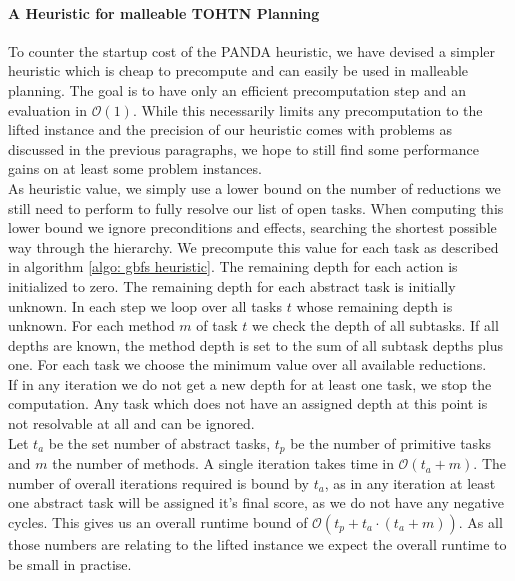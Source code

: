 \paragraph{A Heuristic for malleable TOHTN Planning}
To counter the startup cost of the PANDA heuristic, we have devised a simpler heuristic which is cheap to precompute and can easily be used in malleable planning. The goal is to have only an efficient precomputation step and an evaluation in $\mathcal{O}(1)$. While this necessarily limits any precomputation to the lifted instance and the precision of our heuristic comes with problems as discussed in the previous paragraphs, we hope to still find some performance gains on at least some problem instances. \\
As heuristic value, we simply use a lower bound on the number of reductions we still need to perform to fully resolve our list of open tasks. When computing this lower bound we ignore preconditions and effects, searching the shortest possible way through the hierarchy. We precompute this value for each task as described in algorithm \ref{algo: gbfs heuristic}. The remaining depth for each action is initialized to zero. The remaining depth for each abstract task is initially unknown. In each step we loop over all tasks $t$ whose remaining depth is unknown. For each method $m$ of task $t$ we check the depth of all subtasks. If all depths are known, the method depth is set to the sum of all subtask depths plus one. For each task we choose the minimum value over all available reductions. \\
If in any iteration we do not get a new depth for at least one task, we stop the computation. Any task which does not have an assigned depth at this point is not resolvable at all and can be ignored. \\
Let $t_a$ be the set number of abstract tasks, $t_p$ be the number of primitive tasks and $m$ the number of methods. A single iteration takes time in $\mathcal{O}(t_a + m)$. The number of overall iterations required is bound by $t_a$, as in any iteration at least one abstract task will be assigned it's final score, as we do not have any negative cycles. This gives us an overall runtime bound of $\mathcal{O}(t_p + t_a \cdot(t_a + m))$. As all those numbers are relating to the lifted instance we expect the overall runtime to be small in practise.
